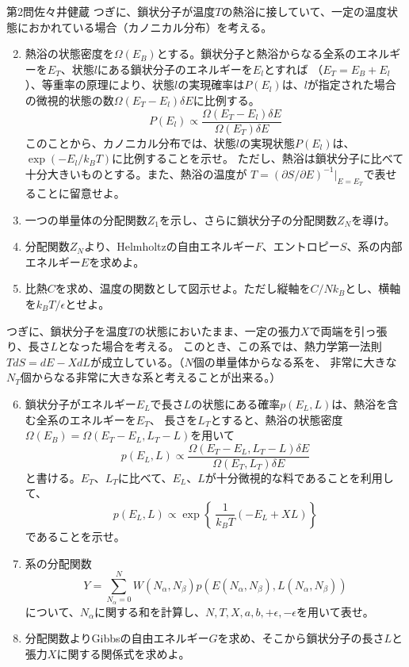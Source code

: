 \documentclass[fleqn]{jbook}
\begin{document}
\begin{question}{第2問}{佐々井健蔵}
つぎに、鎖状分子が温度$T$の熱浴に接していて、一定の温度状態におかれている場合（カノニカル分布）を考える。
\begin{enumerate}
\setcounter{enumi}{1}
\item 熱浴の状態密度を$\Omega (E_B)$とする。鎖状分子と熱浴からなる全系のエネルギーを$E_T$、状態$l$にある鎖状分子のエネルギーを$E_l$とすれば
（$E_T=E_B+E_l$）、等重率の原理により、状態$l$の実現確率は$P(E_l)$は、$l$が指定された場合の微視的状態の数$\Omega (E_T-E_l)\delta E$に比例する。
\begin{equation}
P(E_l)\propto \frac{\Omega (E_T-E_l)\delta E}{\Omega (E_T)\delta E}
\end{equation}
このことから、カノニカル分布では、状態$l$の実現状態$P(E_l)$は、$\exp (-E_l/k_BT)$に比例することを示せ。
ただし、熱浴は鎖状分子に比べて十分大きいものとする。また、熱浴の温度が
$T=(\partial S/\partial E)^{-1}|_{E=E_T}$で表せることに留意せよ。
\item 一つの単量体の分配関数$Z_1$を示し、さらに鎖状分子の分配関数$Z_N$を導け。
\item 分配関数$Z_N$より、Helmholtzの自由エネルギー$F$、エントロピー$S$、系の内部エネルギー$E$を求めよ。
\item 比熱$C$を求め、温度の関数として図示せよ。ただし縦軸を$C/Nk_B$とし、横軸を$k_BT/\epsilon $とせよ。
\end{enumerate}

つぎに、鎖状分子を温度$T$の状態においたまま、一定の張力$X$で両端を引っ張り、長さ$L$となった場合を考える。
このとき、この系では、熱力学第一法則$TdS=dE-XdL$が成立している。（$N$個の単量体からなる系を、
非常に大きな$N_T$個からなる非常に大きな系と考えることが出来る。）
\begin{enumerate}
\setcounter{enumi}{5}
\item 鎖状分子がエネルギー$E_L$で長さ$L$の状態にある確率$p(E_L,L)$は、熱浴を含む全系のエネルギーを$E_T$、
長さを$L_T$とすると、熱浴の状態密度$\Omega (E_B)=\Omega (E_T-E_L,L_T-L)$を用いて
\begin{equation}
p(E_L,L)\propto \frac{\Omega (E_T-E_L,L_T-L)\delta E}{\Omega (E_T,L_T)\delta E}
\end{equation}
と書ける。$E_T$、$L_T$に比べて、$E_L$、$L$が十分微視的な料であることを利用して、
\begin{equation}
p(E_L,L)\propto \exp \left\{\ \frac{1}{k_BT} (-E_L+XL)\right\}
\end{equation}
であることを示せ。

\item 系の分配関数
\begin{equation}
Y=\sum ^{N}_{N_{\alpha }=0}W(N_{\alpha },N_{\beta })p(E(N_{\alpha },N_{\beta }),L(N_{\alpha },N_{\beta }))
\end{equation}
について、$N_{\alpha }$に関する和を計算し、$N,T,X,a,b,+\epsilon ,-\epsilon $を用いて表せ。
\item 分配関数よりGibbsの自由エネルギー$G$を求め、そこから鎖状分子の長さ$L$と張力$X$に関する関係式を求めよ。
\end{enumerate}
\end{question}
\end{document}
